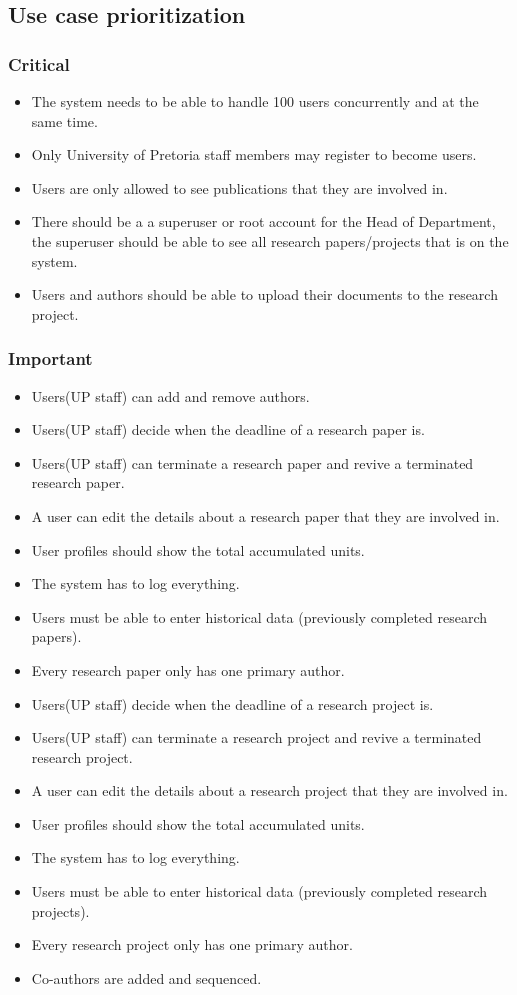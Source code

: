 \documentclass[a4paper,12pt]{report}
\begin{document}
\subsection{Use case prioritization}
\subsubsection{Critical}
	\begin{itemize}
		\item The system needs to be able to handle 100 users concurrently and at the same time.
		\item Only University of Pretoria staff members may register to become users.
		\item Users are only allowed to see publications that they are involved in.
		\item There should be a a superuser or root account for the Head of Department, the superuser should be able to see all research papers/projects that is on the system.
		\item Users and authors should be able to upload their documents to the research project.
	\end{itemize}

\subsubsection{Important}
	\begin{itemize}
		\item Users(UP staff) can add and remove authors.
		\item Users(UP staff) decide when the deadline of a research paper is.
		\item Users(UP staff) can terminate a research paper and revive a terminated research paper.
		\item A user can edit the details about a research paper that they are involved in.
		\item User profiles should show the total accumulated units.
		\item The system has to log everything.
		\item Users must be able to enter historical data (previously completed research papers).
		\item Every research paper only has one primary author.
		\item Users(UP staff) decide when the deadline of a research project is.
		\item Users(UP staff) can terminate a research project and revive a terminated research project.
		\item A user can edit the details about a research project that they are involved in.
		\item User profiles should show the total accumulated units.
		\item The system has to log everything.
		\item Users must be able to enter historical data (previously completed research projects).
		\item Every research project only has one primary author.
		\item Co-authors are added and sequenced.
	\end{itemize}
\end{document}
